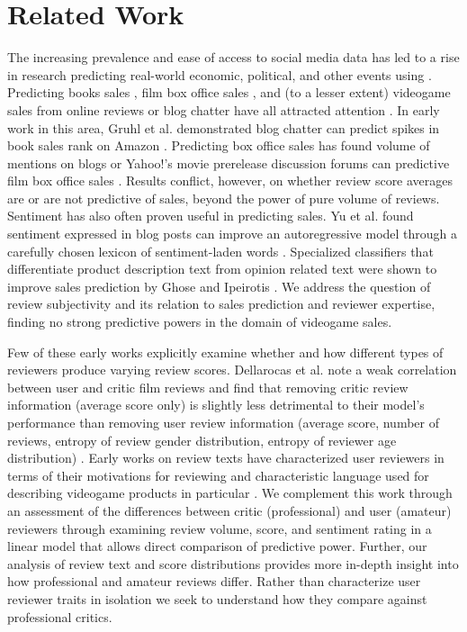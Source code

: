 \documentclass[letterpaper]{article}
\begin{document}
\section{Related Work}
The increasing prevalence and ease of access to social media data has led to a rise in research predicting real-world economic, political, and other events using \cite{asur2010predicting}. Predicting books sales \cite{gruhl2005predictive}, film box office sales \cite{dellarocas2007exploring}\cite{yu2012mining}, and (to a lesser extent) videogame sales from online reviews or blog chatter have all attracted attention \cite{ehrenfeld2011predicting}\cite{marcoux2009hybrid}. In early work in this area, Gruhl et al. demonstrated blog chatter can predict spikes in book sales rank on Amazon \cite{gruhl2005predictive}. 
Predicting box office sales has found volume of mentions on blogs or Yahoo!'s movie prerelease discussion forums can predictive film box office sales \cite{liu2001word}\cite{duan2008online}. Results conflict, however, on whether review score averages are \cite{dellarocas2007exploring} or are not \cite{liu2001word}\cite{duan2008online} predictive of sales, beyond the power of pure volume of reviews.
Sentiment has also often proven useful in predicting sales. Yu et al. found sentiment expressed in blog posts can improve an autoregressive model through a carefully chosen lexicon of sentiment-laden words \cite{yu2012mining}. Specialized classifiers that differentiate product description text from opinion related text were shown to improve sales prediction by Ghose and Ipeirotis \cite{ghose2007designing}. 
We address the question of review subjectivity and its relation to sales prediction and reviewer expertise, finding no strong predictive powers in the domain of videogame sales.

Few of these early works explicitly examine whether and how different types of reviewers produce varying review scores. Dellarocas et al. note a weak correlation between user and critic film reviews and find that removing critic review information (average score only) is slightly less detrimental to their model's performance than removing user review information (average score, number of reviews, entropy of review gender distribution, entropy of reviewer age distribution) \cite{dellarocas2007exploring}. Early works on review texts have characterized user reviewers in terms of their motivations for reviewing \cite{gilbert2010deja} and characteristic language used for describing videogame products in particular \cite{zagal2011natural}. We complement this work through an assessment of the differences between critic (professional) and user (amateur) reviewers through examining review volume, score, and sentiment rating in a linear model that allows direct comparison of predictive power. Further, our analysis of review text and score distributions provides more in-depth insight into how professional and amateur reviews differ. Rather than characterize user reviewer traits in isolation we seek to understand how they compare against professional critics.
\end{document}
